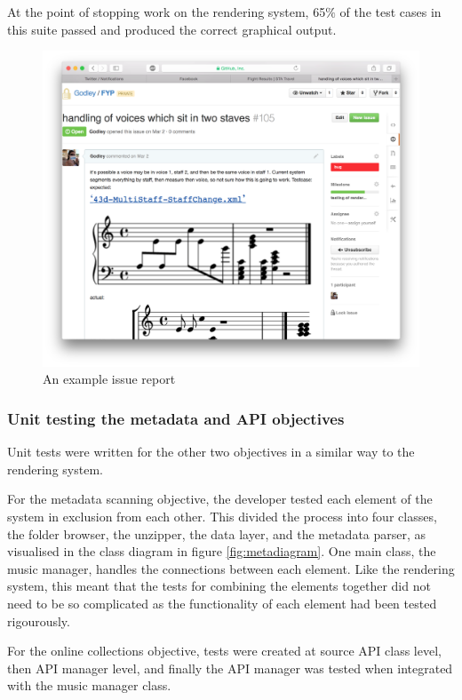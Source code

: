 At the point of stopping work on the rendering system, 65$\%$ of the test cases in this suite passed and produced the correct graphical output. 
\begin{figure}[H]
	\centering
	\includegraphics[width=400pt]{issue_report}	
	\caption{An example issue report}
	\label{fig:issue}
\end{figure}

\subsubsection{Unit testing the metadata and API objectives}
Unit tests were written for the other two objectives in a similar way to the rendering system.

For the metadata scanning objective, the developer tested each element of the system in exclusion from each other. This divided the process into four classes, the folder browser, the unzipper, the data layer, and the metadata parser, as visualised in the class diagram in figure \ref{fig:metadiagram}. One main class, the music manager, handles the connections between each element. Like the rendering system, this meant that the tests for combining the elements together did not need to be so complicated as the functionality of each element had been tested rigourously.

For the online collections objective, tests were created at source API class level, then API manager level, and finally the API manager was tested when integrated with the music manager class.

